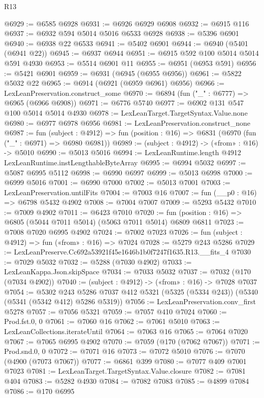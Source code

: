 \begin{lexlean}{R13}
\begin{coremodule}
@6929 := @6585 @6928
@6931 := @6926 @6929 @6908
@6932 := @6915 @116
@6937 := @6932 @594 @5014 @5016 @6533 @6928
@6938 := @5396 @6901
@6940 := @6938 @22 @6533
@6941 := @5402 @6901
@6944 := @6940 (@5401 (@6941 @22))
@6945 := @6937 @6944
@6951 := @6915 @592 @100 @5014 @5014 @591 @4930
@6953 := @5514 @6901 @11
@6955 := @6951 (@6953 @591)
@6956 := @5421 @6901
@6959 := @6931 (@6945 (@6955 @6956))
@6961 := @5822 @5032 @22
@6965 := @6914 (@6921 (@6959 @6961) @6956)
@6966 := LexLeanPreservation.construct_some
@6970 := @6894 (fun ("_" : @6777) => @6965 (@6966 @6908))
@6971 := @6776 @5740
@6977 := @6902 @131 @547 @100 @5014 @5014 @4930
@6978 := LexLeanTarget.TargetSyntax.Value.none
@6980 := @6977 @6978 @6956
@6981 := LexLeanPreservation.construct_none
@6987 := fun (subject : @4912) =>
  fun (position : @16) => @6831 (@6970 (fun ("_" : @6971) => @6980 @6981))
@6989 := (subject : @4912) -> («from» : @16) -> @5010
@6990 := @5013 @5016
@6994 := LexLeanRuntime.length @4912 LexLeanRuntime.instLengthableByteArray
@6995 := @6994 @5032
@6997 := @5087 @6995 @5112
@6998 := @6990 @6997
@6999 := @5013 @6998
@7000 := @6999 @5016
@7001 := @6990 @7000
@7002 := @5013 @7001
@7003 := LexLeanPreservation.untilFits
@7004 := @7003 @16
@7007 := fun (__p0 : @16) => @6798 @5432 @4902
@7008 := @7004 @7007
@7009 := @5293 @5432
@7010 := @7009 @4902
@7011 := @6423 @7010
@7020 := fun (position : @16) => @6805 (@5044 @7011 @5014) (@5063 @7011 @5014) @6809 @6811
@7023 := @7008 @7020 @6995 @4902
@7024 := @7002 @7023
@7026 := fun (subject : @4912) => fun («from» : @16) => @7024
@7028 := @5279 @243 @5286
@7029 := LexLeanPreserve.Cc692a53921f45e1646b1b0f7247f1635.R13.__fits_4
@7030 := @7029 @5032
@7032 := @5288 (@7030 @4902)
@7033 := LexLeanKappa.Json.skipSpace
@7034 := @7033 @5032
@7037 := @7032 (@170 (@7034 @4902))
@7040 := (subject : @4912) -> («from» : @16) -> @7028 @7037
@7054 := @5302
    @243
    @5286
    @7037
    @412
    @5321
    (@5325 (@5334 @243))
    (@5340 (@5341 (@5342 @412) @5286 @5319))
@7056 := LexLeanPreservation.conv_first @5278
@7057 := @7056 @5321
@7059 := @7057 @410 @7024
@7060 := Prod.fst.{0, 0}
@7061 := @7060 @16
@7062 := @7061 @5010
@7063 := LexLeanCollections.iterateUntil
@7064 := @7063 @16
@7065 := @7064 @7020
@7067 := @7065 @6995 @4902
@7070 := @7059 (@170 (@7062 @7067))
@7071 := Prod.snd.{0, 0}
@7072 := @7071 @16
@7073 := @7072 @5010
@7076 := @7070 (@4900 (@7073 @7067))
@7077 := @6861 @399
@7080 := @7077 @409 @7001 @7023
@7081 := LexLeanTarget.TargetSyntax.Value.closure
@7082 := @7081 @404
@7083 := @5282 @4930
@7084 := @7082 @7083
@7085 := @4899 @7084
@7086 := @170 @6995

\end{coremodule}
\end{lexlean}
